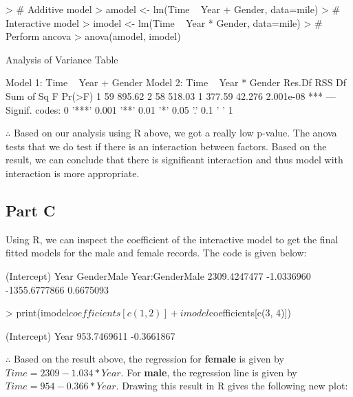 \documentclass{article}
\begin{document}
\begin{Schunk}
\begin{Sinput}
> # Additive model
> amodel <- lm(Time ~ Year + Gender, data=mile)
> # Interactive model
> imodel <- lm(Time ~ Year * Gender, data=mile)
> # Perform ancova
> anova(amodel, imodel)
\end{Sinput}
\begin{Soutput}
Analysis of Variance Table

Model 1: Time ~ Year + Gender
Model 2: Time ~ Year * Gender
  Res.Df    RSS Df Sum of Sq      F    Pr(>F)    
1     59 895.62                                  
2     58 518.03  1    377.59 42.276 2.001e-08 ***
---
Signif. codes:  0 '***' 0.001 '**' 0.01 '*' 0.05 '.' 0.1 ' ' 1
\end{Soutput}
\end{Schunk}

\noindent $\therefore$ Based on our analysis using R above, we got a really low p-value. The anova tests that we do test if there is an interaction between factors. Based on the result, we can conclude that there is significant interaction and thus model with interaction is more appropriate.

\subsection{Part C}
Using R, we can inspect the coefficient of the interactive model to get the final fitted models for the male and female records. The code is given below:

\begin{Schunk}
\begin{Soutput}
    (Intercept)            Year      GenderMale Year:GenderMale 
   2309.4247477      -1.0336960   -1355.6777866       0.6675093 
\end{Soutput}
\begin{Sinput}
> print(imodel$coefficients[c(1, 2)] + imodel$coefficients[c(3, 4)])
\end{Sinput}
\begin{Soutput}
(Intercept)        Year 
953.7469611  -0.3661867 
\end{Soutput}
\end{Schunk}
\noindent $\therefore$ Based on the result above, the regression for \textbf{female} is given by $Time = 2309 - 1.034 * Year$. For \textbf{male}, the regression line is given by $Time = 954 - 0.366 * Year$. Drawing this result in R gives the following new plot:
\end{document}
